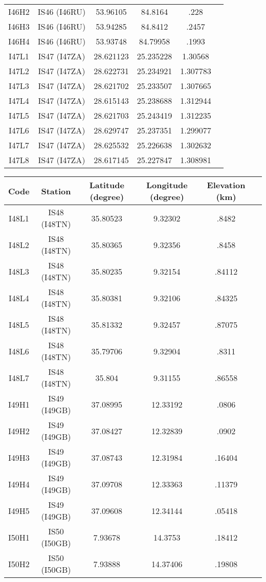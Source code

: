 \documentclass[a4paper, 10pt]{report}
\begin{document}
{\begin{center}
\begin{tabular}{|c|c|c|c|c|c|}
I46H2&	IS46 (I46RU)&	 	53.96105&	84.8164&	.228\\
I46H3&	IS46 (I46RU)&	 	53.94285&	84.8412&	.2457\\
I46H4&	IS46 (I46RU)&	 	53.93748&	84.79958&	.1993\\
I47L1&	IS47 (I47ZA)&	 	28.621123&	25.235228&	1.30568\\
I47L2&	IS47 (I47ZA)&	 	28.622731&	25.234921&	1.307783\\
I47L3&	IS47 (I47ZA)&	 	28.621702&	25.233507&	1.307665\\
I47L4&	IS47 (I47ZA)&	 	28.615143&	25.238688&	1.312944\\
I47L5&	IS47 (I47ZA)&	 	28.621703&	25.243419&	1.312235\\
I47L6&	IS47 (I47ZA)&	 	28.629747&	25.237351&	1.299077\\
I47L7&	IS47 (I47ZA)&	 	28.625532&	25.226638&	1.302632\\
I47L8&	IS47 (I47ZA)&	 	28.617145&	25.227847&	1.308981\\
\hline
\end{tabular}
\end{center}
\begin{center}
\begin{tabular}{|c|c|c|c|c|c|}
\hline
Code&	Station&	Latitude (degree)&	Longitude (degree)&	Elevation (km)\\
\hline
I48L1&	IS48 (I48TN)&	 	35.80523&	9.32302&	.8482\\
I48L2&	IS48 (I48TN)&	 	35.80365&	9.32356&	.8458\\
I48L3&	IS48 (I48TN)&	 	35.80235&	9.32154&	.84112\\
I48L4&	IS48 (I48TN)&	 	35.80381&	9.32106&	.84325\\
I48L5&	IS48 (I48TN)&	 	35.81332&	9.32457&	.87075\\
I48L6&	IS48 (I48TN)&	 	35.79706&	9.32904&	.8311\\
I48L7&	IS48 (I48TN)&	 	35.804&	9.31155&	.86558\\
I49H1&	IS49 (I49GB)&	 	37.08995&	12.33192&	.0806\\
I49H2&	IS49 (I49GB)&	 	37.08427&	12.32839&	.0902\\
I49H3&	IS49 (I49GB)&	 	37.08743&	12.31984&	.16404\\
I49H4&	IS49 (I49GB)&	 	37.09708&	12.33363&	.11379\\
I49H5&	IS49 (I49GB)&	 	37.09608&	12.34144&	.05418\\
I50H1&	IS50 (I50GB)&	 	7.93678&	14.3753&	.18412\\
I50H2&	IS50 (I50GB)&	 	7.93888&	14.37406&	.19808\\

\end{tabular}
\end{center}}
\end{document}
